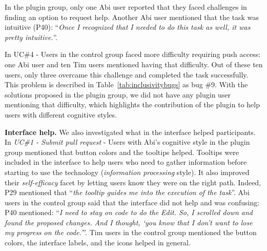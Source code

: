 {In the plugin group, only one Abi user reported that they faced challenges in finding an option to request help. Another Abi user mentioned that the task was intuitive (P40): ``\textit{Once I recognized that I needed to do this task as well, it was pretty intuitive.}''. 




In UC\#4 - Users in the control group faced more difficulty requiring push access: one Abi user and ten Tim users mentioned having that difficulty. Out of these ten users, only three overcame this challenge and completed the task successfully. This problem is described in Table~\ref{tab:inclusivitybugs} as bug \#9. With the solutions proposed in the plugin group, we did not have any plugin user mentioning that difficulty, which highlights the contribution of the plugin to help users with different cognitive styles.


\textbf{Interface help.} We also investigated what in the interface helped participants. In \textit{UC\#1 - Submit pull request} - Users with Abi's cognitive style in the plugin group mentioned that button colors and the tooltips helped. Tooltips were included in the interface to help users who need to gather information before starting to use the technology (\textit{information processing} style). It also improved their \textit{self-efficacy} facet by letting users know they were on the right path. Indeed, P29 mentioned that ``\textit{the tooltip guides me into the execution of the task}''. %
Abi users in the control group said that the interface did not help and was confusing: P40 mentioned: ``\textit{I need to stay on code to do the Edit. So, I scrolled down and found the proposed changes. And I thought, `you know that I don't want to lose my progress on the code.'}''. Tim users in the control group mentioned the button colors, the interface labels, and the icons helped in general. 

}
